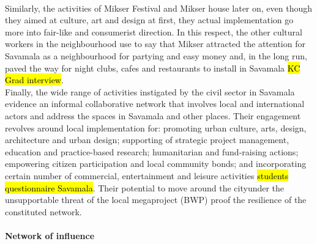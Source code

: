 \documentclass[11pt]{report}
\begin{document}
\\
Similarly, the activities of Mikser Festival and Mikser house later on, even though they aimed at culture, art and design at first, they actual implementation go more into fair-like and consumerist direction. In this respect, the other cultural workers in the neighbourhood use to say that Mikser attracted the attention for Savamala as a neighbourhood for partying and easy money and, in the long run, paved the way for night clubs, cafes and restaurants to install in Savamala
\hl{KC Grad interview}.
\\
Finally, the wide range of activities instigated by the civil sector in Savamala evidence an informal collaborative network that involves local and international actors and address the spaces in Savamala and other places. Their engagement revolves around local implementation for:
promoting urban culture, arts, design, architecture and urban design;
supporting of strategic project management, education and practice-based research;
humanitarian and fund-raising actions;
empowering citizen participation and local community bonds;
and incorporating certain number of commercial, entertainment and leisure activities
\hl{students questionnaire Savamala}.
Their potential to move around the city\footnotemark under the unsupportable threat of the local megaproject (BWP) proof the resilience of the constituted network.  

\paragraph{Network of influence}
\end{document}
